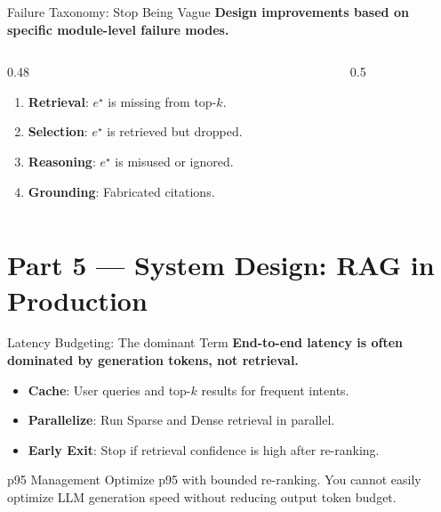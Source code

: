 \documentclass[aspectratio=169, xcolor=table]{beamer}
\newif\ifanimated
\newcommand{\cpause}{\ifanimated\pause\fi}
\begin{document}
\begin{frame}{Failure Taxonomy: Stop Being Vague}
\textbf{Design improvements based on specific module-level failure modes.}

\vspace{0.8em}
\begin{columns}[T]
\begin{column}{0.48\textwidth}
\begin{enumerate}
    \item \textbf{Retrieval}: $e^\star$ is missing from top-$k$.
    \item \textbf{Selection}: $e^\star$ is retrieved but dropped.
    \item \textbf{Reasoning}: $e^\star$ is misused or ignored.
    \item \textbf{Grounding}: Fabricated citations.
\end{enumerate}
\end{column}
\begin{column}{0.5\textwidth}
\begin{center}
\resizebox{\textwidth}{!}{

}
\end{center}
\end{column}
\end{columns}
\end{frame}

\section{Part 5 --- System Design: RAG in Production}

\begin{frame}[plain]
\sectionpage
\end{frame}

\begin{frame}{Latency Budgeting: The dominant Term}
\textbf{End-to-end latency is often dominated by generation tokens, not retrieval.}

\vspace{0.8em}
\begin{itemize}
    \item \textbf{Cache}: User queries and top-$k$ results for frequent intents.
    \item \textbf{Parallelize}: Run Sparse and Dense retrieval in parallel.
    \item \textbf{Early Exit}: Stop if retrieval confidence is high after re-ranking.
\end{itemize}

\vspace{1em}
\cpause
\begin{alertblock}{p95 Management}
Optimize p95 with bounded re-ranking. You cannot easily optimize LLM generation speed without reducing output token budget.
\end{alertblock}
\end{frame}
\end{document}
